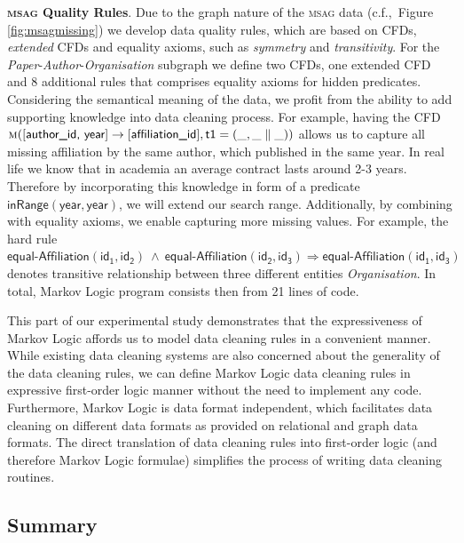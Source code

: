 \textbf{\textsc{msag} Quality Rules}. Due to the graph nature of the \textsc{msag} data (c.f.,~Figure \ref{fig:msagmissing}) we develop data quality rules, which are based on CFDs, \textit{extended} CFDs \cite{Chen2009extended} and equality axioms, such as \textit{symmetry} and \textit{transitivity}. For the \textit{Paper}-\textit{Author}-\textit{Organisation} subgraph we define two CFDs, one extended CFD and 8 additional rules that comprises equality axioms for hidden predicates. Considering the semantical meaning of the data, we profit from the ability to add supporting knowledge into data cleaning process. For example, having the CFD $\mathsf{\textsc{m}([\textsf{author\_id, year}] \rightarrow [\textsf{affiliation\_id}],t1=(\_,\_ \parallel \_))} $  allows us to capture all missing affiliation by the same author, which published in the same year. In real life we know that in academia an average contract lasts around 2-3 years. Therefore by incorporating this knowledge in form of a predicate $\mathsf{\textsf{inRange}(year, year)}$, we will extend our search range. Additionally, by combining with equality axioms, we enable capturing more missing values. For example, the hard rule $\mathsf{\textsf{equal-Affiliation}(id_1, id_2) ~\wedge~ \textsf{equal-Affiliation}(id_2, id_3) \Rightarrow  \textsf{equal-Affiliation}(id_1, id_3)}$ denotes transitive relationship between three different entities \textit{Organisation}. In total, Markov Logic program consists then from 21 lines of code. 

This part of our experimental study demonstrates that the expressiveness of Markov Logic affords us to model data cleaning rules in a convenient  manner. While existing data cleaning systems \cite{Dallachiesa:2013:NCD:2463676.2465327} are also concerned about the generality of the data cleaning rules, we can define Markov Logic data cleaning rules in expressive first-order logic manner without the need to implement any code.  Furthermore, Markov Logic is data format independent, which facilitates data cleaning on different data formats as provided on relational and graph data formats. The direct translation of data cleaning rules into first-order logic (and therefore Markov Logic formulae) simplifies the process of writing data cleaning routines. 


\subsection{Summary}

